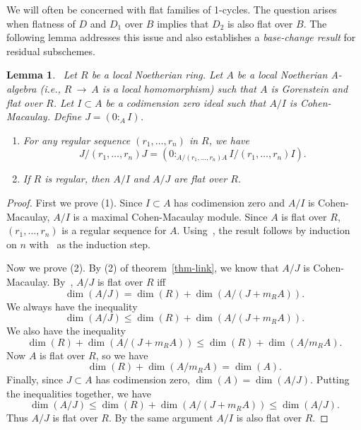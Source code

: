 \documentclass[twoside,12pt,reqno]{amsart}
\theoremstyle{plain}
\newtheorem{lem}[thm]{Lemma}
\theoremstyle{definition}
\def\ps{\vspace{4pt}}
\newcommand{\lt}{\left}
\newcommand{\rt}{\right}
\begin{document}
We will often be concerned with flat families of 1-cycles.  The
question arises when flatness of $D$ and $D_1$ over $B$ implies that
$D_2$ is also flat over $B$.  The following lemma addresses this issue 
and also establishes a \emph{base-change result} for residual subschemes.

\ps

\begin{lem}~\label{lem-flatlink}  Let $R$ be a local Noetherian ring.  Let
$A$ be a local Noetherian A-algebra (i.e., $R~\rightarrow~ A$ is a
local homomorphism) such that $A$ is Gorenstein and flat over $R$.
Let $I\subset A$ be a codimension zero ideal such that $A/I$ is
Cohen-Macaulay.  Define $J=(0:_A I)$.
\begin{enumerate}
\item For any regular sequence $(r_1,\dots,r_n)$ in $R$, we have 
\begin{equation}\label{eqn-10}
 J/(r_1,\dots,r_n)J = \lt(0:_{A/(r_1,\dots,r_n)A} I/(r_1,\dots,r_n)I 
\rt).\end{equation}
\item If $R$ is regular, then $A/I$ and $A/J$ are flat over $R$.
\end{enumerate}
\end{lem}

\begin{proof}
First we prove (1).  Since $I\subset A$ has codimension zero and $A/I$ 
is Cohen-Macaulay, $A/I$ is a maximal Cohen-Macaulay module.  Since
$A$ is flat over $R$, $(r_1,\dots,r_n)$ is a regular sequence for
$A$.  Using~\cite[proposition 18.13]{E}, the result follows by induction on 
$n$ with~\cite[proposition 21.12(b)]{E} as the induction step.

\ps

Now we prove (2).  By (2) of theorem~\ref{thm-link}, we know that
$A/J$ is Cohen-Macaulay.  By~\cite[theorem 18.16]{E}, $A/J$ is flat
over $R$ iff
\begin{equation}\label{eqn-11}
\dim (A/J) = \dim (R) + \dim (A/(J+m_R A)).
\end{equation}
We always have the inequality
\begin{equation}\label{eqn-12}
\dim (A/J) \leq \dim (R) +
\dim (A/(J+m_R A)).\end{equation} 
We also have the inequality
\begin{equation}\label{eqn-13}
\dim (R) + \dim (A/(J+m_R A)) \leq \dim (R) +
\dim (A/m_R A).\end{equation}
Now $A$ is flat over $R$, so we have 
\begin{equation}\label{eqn-14}
\dim (R)+\dim (A/m_R A) = \dim (A).\end{equation}
Finally, since $J\subset A$ has codimension zero,
$\dim (A)=\dim (A/J)$.  Putting the inequalities together,
we have
\begin{equation}\label{eqn-15}
\dim (A/J)\leq \dim (R) + \dim (A/(J+m_R A)) \leq
\dim (A/J).\end{equation}
Thus $A/J$ is flat over $R$.  By the same argument $A/I$ is also flat
over $R$.
\end{proof}
\end{document}
